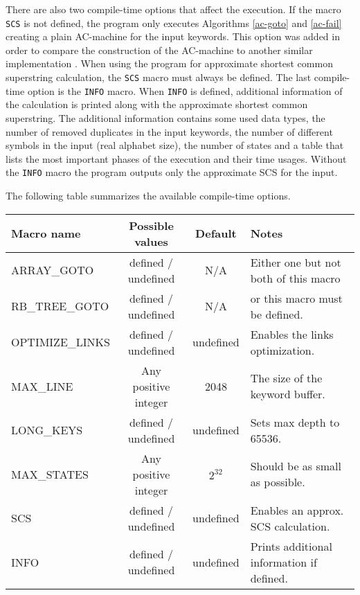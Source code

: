 \documentclass[english,twoside,censored,csm,algorithms-track-2020]{HYthesisML}
\theoremstyle{plain}
\theoremstyle{definition}
\begin{document}
There are also two compile-time options that affect the execution. If the macro \texttt{SCS}
is not defined,
the program only executes Algorithms \ref{ac-goto} and \ref{ac-fail} creating a plain AC-machine
for the input keywords. This option was added in order to compare the construction of the
AC-machine to another similar implementation \citep{Salmela06}. When using the program for approximate
shortest common superstring calculation, the \texttt{SCS} macro must always be defined. The last
compile-time option is the \texttt{INFO} macro. When \texttt{INFO} is defined, additional information
of the calculation
is printed along with the approximate shortest common superstring. The additional information contains
some used data types, the number of removed duplicates in the input keywords, the number of different symbols
in the input (real alphabet size), the number of states and a table that lists the most important
phases of the execution and their time usages. Without the \texttt{INFO} macro the program outputs only
the approximate SCS for the input.

The following table summarizes the available compile-time options.\\

\hspace{-0.9cm}
  \begin{tabular}{ |l|c|c|l| }
    \hline
    \textbf{Macro name} & \textbf{Possible values} & \textbf{Default} & \textbf{Notes} \\
 \hline
 ARRAY\_GOTO & defined / undefined & N/A & Either one but not both of this macro \\
 RB\_TREE\_GOTO & defined / undefined & N/A & or this macro must be defined. ~~~ \\
 OPTIMIZE\_LINKS & defined / undefined  & undefined & Enables the links optimization.\\
 MAX\_LINE & Any positive integer & 2048 & The size of the keyword buffer. \\
 LONG\_KEYS & defined / undefined & undefined & Sets max depth to 65536. \\
 MAX\_STATES & Any positive integer & $2^{32}$ & Should be as small as possible. \\
 SCS & defined / undefined & undefined & Enables an approx. SCS calculation. \\
 INFO & defined / undefined & undefined & Prints additional information if defined.\\
 \hline
  \end{tabular}
\end{document}
